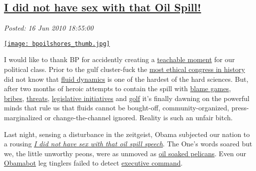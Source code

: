 %

\subsection*{\href{http://bakerjd99.wordpress.com/2010/06/16/i-did-not-have-sex-with-that-oil-spill/}{I did not have sex with that Oil Spill!}}


\noindent\emph{Posted: 16 Jun 2010 18:55:00}
\vspace{6pt}

\captionsetup[floatingfigure]{labelformat=empty}
\begin{floatingfigure}[l]{0.33\textwidth}
\centering
\href{http://politicalhumor.about.com/b/2010/05/31/bp-were-bringing-oil-to-american-shores.htm}{\texttt{[image: bpoilshores\_thumb.jpg]}}
\label{fig:616X0}
\end{floatingfigure}I would like to thank BP for accidently creating a
\href{http://k6educators.about.com/od/educationglossary/g/gteachmoment.htm}{teachable
moment} for our political class. Prior to the gulf cluster-fuck the
\href{http://www.breitbart.tv/pelosi-still-says-she\%E2\%80\%99s-running-\%E2\%80\%98most-ethical\%E2\%80\%99-congress-ever/}{most
ethical congress in history} did not know that
\href{http://www.claymath.org/millennium/Navier-Stokes\_Equations/}{fluid
dynamics} is one of the hardest of the hard sciences. But, after two
months of heroic attempts to contain the spill with
\href{http://www.treehugger.com/files/2010/06/breaking-down-bp-gulf-spill-blame-game.php}{blame
games},
\href{http://www.free-press-release.com/news-gulf-oil-scandal-mineral-management-services-bribery-1274902506.html}{bribes},
\href{http://www.washingtonexaminer.com/opinion/blogs/beltway-confidential/with-doj-threatening-prosecution-obama-slams-bp-for-lawyering-up-95647809.html}{threats},
\href{http://www.ldjackson.net/news-politics/the-gulf-oil-spill-and-cap-and-trade/}{legislative
initiatives} and
\href{http://standbyliberty.org/2010/06/14/obama-golf-vs-the-gulf-you-decide-who-is-winning-better-yet-just-blame-bush/}{golf}
it's finally dawning on the powerful minds that rule us that fluids
cannot be bought-off, community-organized, press-marginalized or
change-the-channel ignored. Reality is such an unfair bitch.

Last night, sensing a disturbance in the zeitgeist, Obama subjected our
nation to a rousing
\emph{\href{http://www.youtube.com/watch?v=Gh76oepKFc8}{I did not have
sex with that oil spill speech}}. The One's words soared but we, the
little unworthy peons, were as unmoved as
\href{http://www.aolnews.com/opinion/article/opinion-why-this-is-the-iconic-gulf-oil-spill-picture/19503566}{oil
soaked pelicans}. Even our
\href{http://www.urbandictionary.com/define.php?term=obamabot}{Obamabot}
leg tinglers failed to detect
\href{http://www.realclearpolitics.com/video/2010/06/15/msnbc\_trashes\_obamas\_address\_compared\_to\_carter\_i\_dont\_sense\_executive\_command.html}{executive
command}.

